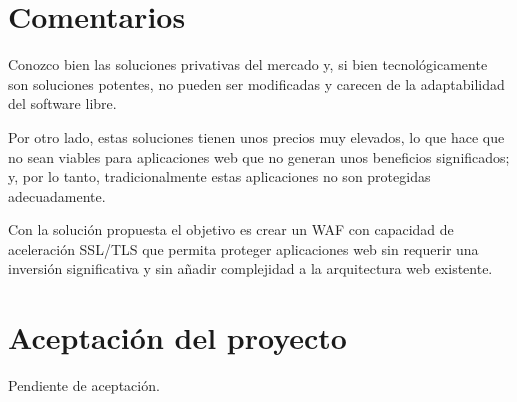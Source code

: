 \section{Comentarios}

\par Conozco bien las soluciones privativas del mercado y, si bien tecnológicamente son soluciones potentes, no
pueden ser modificadas y carecen de la adaptabilidad del software libre.
\par Por otro lado, estas soluciones tienen unos precios muy elevados, lo que hace que no sean viables para
aplicaciones web que no generan unos beneficios significados; y, por lo tanto, tradicionalmente estas aplicaciones no
son protegidas adecuadamente.
\par Con la solución propuesta el objetivo es crear un WAF con capacidad de aceleración SSL/TLS que permita proteger
aplicaciones web sin requerir una inversión significativa y sin añadir complejidad a la arquitectura web existente.

\section{Aceptación del proyecto}
\par Pendiente de aceptación.

\clearpage
\printglossary[title=Acrónimos,type=\acronymtype]
\printglossary[title=Glosario]
 
\printbibliography[heading=bibintoc]
\label{biblio}


